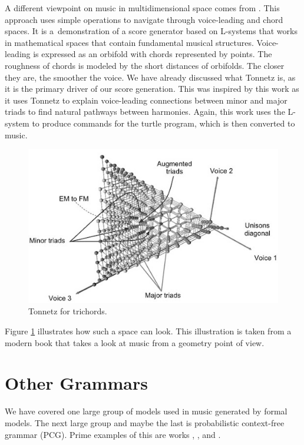 A different viewpoint on music in multidimensional space comes from \cite{gogins}. This approach uses simple operations to navigate through voice-leading and chord spaces. It is a~demonstration of a score generator based on L-systems that works in mathematical spaces that contain fundamental musical structures. Voice-leading is expressed as an orbifold with chords represented by points. The roughness of chords is modeled by the short distances of orbifolds. The closer they are, the smoother the voice. We have already discussed what Tonnetz is, as it is the primary driver of our score generation. This was inspired by this work as it uses Tonnetz to explain voice-leading connections between minor and major triads to find natural pathways between harmonies. Again, this work uses the L-system to produce commands for the turtle program, which is then converted to music.

\begin{figure}[H]
    \centering
    \includegraphics[scale=0.35]{obrazky-figures/trichordspace.jpg}
    \caption{Tonnetz for trichords.}
    \label{fig:goginstrichord}
\end{figure}

Figure \ref{fig:goginstrichord} illustrates how such a space can look. This illustration is taken from a modern book \cite{tymoczko2010geometry} that takes a look at music from a geometry point of view.

\section{Other Grammars}
We have covered one large group of models used in music generated by formal models. The next large group and maybe the last is probabilistic context-free grammar (PCG). Prime examples of this are works \cite{gramimprovisation}, \cite{probmelodyreduction}, and \cite{africathesis}. 

